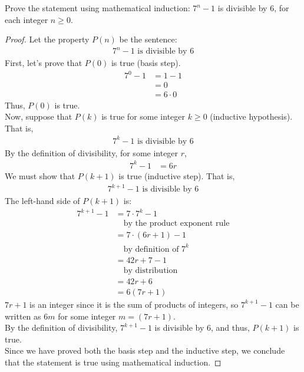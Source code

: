 \documentclass[name=Ojas\ Chaturvedi, emailid=oj.chaturvedi.2024, course=Capstone:\ Discrete\ Math, num=8, deadline={November\ 2,\ 2023}]{homework}
\begin{document}
\separator

Prove the statement using mathematical induction: $7^n - 1$ is divisible by $6$, for each integer $n \geq 0$.
\begin{proof}
    Let the property $P(n)$ be the sentence:
    \begin{align*}
        7^n - 1 \text{ is divisible by } 6
    \end{align*}
    First, let's prove that $P(0)$ is true (basis step).
    \begin{align*}
        7^0 - 1 &= 1 -1 \\
        &= 0 \\
        &= 6 \cdot 0
    \end{align*}
    Thus, $P(0)$ is true. \\
    Now, suppose that $P(k)$ is true for some integer $k \geq 0$ (inductive hypothesis). That is,
    \begin{align*}
        7^k - 1 \text{ is divisible by } 6
    \end{align*}
    By the definition of divisibility, for some integer $r$,
    \begin{align*}
        7^k - 1 &= 6r
    \end{align*}
    We must show that $P(k+1)$ is true (inductive step). That is,
    \begin{align*}
        7^{k+1} - 1 \text{ is divisible by } 6
    \end{align*}
    The left-hand side of $P(k+1)$ is:
    \begin{align*}
        7^{k+1} - 1 &= 7 \cdot 7^k - 1 \\
        & \quad \text{by the product exponent rule} \\
        &= 7 \cdot (6r + 1) - 1 \\
        & \quad \text{by definition of $7^k$} \\
        &= 42r + 7 - 1 \\
        & \quad \text{by distribution} \\
        &= 42r + 6 \\
        &= 6(7r + 1)
    \end{align*}
    $7r + 1$ is an integer since it is the sum of products of integers, so $7^{k+1} - 1$ can be written as $6m$ for some integer $m = (7r + 1)$. \\
    By the definition of divisibility, $7^{k+1} - 1$ is divisible by $6$, and thus, $P(k+1)$ is true. \\
    Since we have proved both the basis step and the inductive step, we conclude that the statement is true using mathematical induction.
\end{proof}
\end{document}
